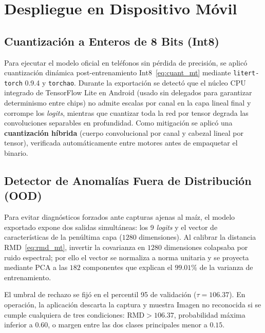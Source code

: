 \section{Despliegue en Dispositivo M\'ovil}

\subsection{Cuantizaci\'on a Enteros de 8 Bits (Int8)}
Para ejecutar el modelo oficial en tel\'efonos sin p\'erdida de precisi\'on, se aplic\'o cuantizaci\'on din\'amica post-entrenamiento Int8~\eqref{eq:cuant_mt} mediante \texttt{litert-torch} 0.9.4 y \texttt{torchao}. Durante la exportaci\'on se detect\'o que el n\'ucleo CPU integrado de TensorFlow Lite en Android (usado sin delegados para garantizar determinismo entre chips) no admite escalas por canal en la capa lineal final y corrompe los \textit{logits}, mientras que cuantizar toda la red por tensor degrada las convoluciones separables en profundidad. Como mitigaci\'on se aplic\'o una \textbf{cuantizaci\'on h\'ibrida} (cuerpo convolucional por canal y cabezal lineal por tensor), verificada autom\'aticamente entre motores antes de empaquetar el binario.

\subsection{Detector de Anomal\'ias Fuera de Distribuci\'on (OOD)}
Para evitar diagn\'osticos forzados ante capturas ajenas al ma\'iz, el modelo exportado expone dos salidas simult\'aneas: los 9 \textit{logits} y el vector de caracter\'isticas de la pen\'ultima capa ($1280$ dimensiones). Al calibrar la distancia RMD~\eqref{eq:rmd_mt}, invertir la covarianza en $1280$ dimensiones colapsaba por ruido espectral; por ello el vector se normaliza a norma unitaria y se proyecta mediante PCA a las $182$ componentes que explican el $99.01\%$ de la varianza de entrenamiento.

El umbral de rechazo se fij\'o en el percentil 95 de validaci\'on ($\tau = 106.37$). En operaci\'on, la aplicaci\'on descarta la captura y muestra \guillemotleft Imagen no reconocida\guillemotright{} si se cumple cualquiera de tres condiciones: $\text{RMD} > 106.37$, probabilidad m\'axima inferior a $0.60$, o margen entre las dos clases principales menor a $0.15$.

